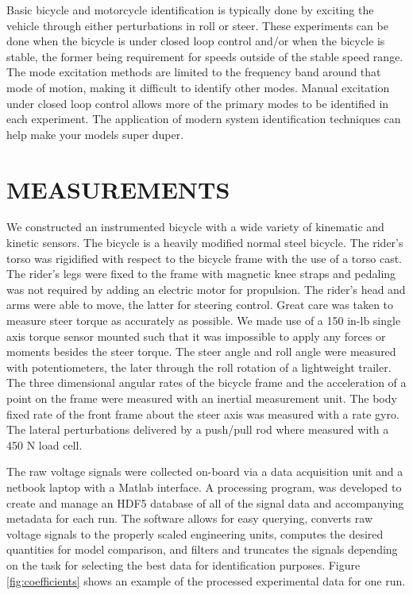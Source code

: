 \documentclass[twocolumn,10pt]{asme2e}
\begin{document}
Basic bicycle and motorcycle identification is typically done by exciting the
vehicle through either perturbations in roll or steer. These experiments can be
done when the bicycle is under closed loop control and/or when the bicycle is
stable, the former being requirement for speeds outside of the stable speed
range.  The mode excitation methods are limited to the frequency band around
that mode of motion, making it difficult to identify other modes.  Manual
excitation under closed loop control allows more of the primary modes to be
identified in each experiment. The application of modern system identification
techniques can help make your models super duper.

\section*{MEASUREMENTS}
We constructed an instrumented bicycle with a wide variety of kinematic and
kinetic sensors. The bicycle is a heavily modified normal steel bicycle. The
rider's torso was rigidified with respect to the bicycle frame with the use of
a torso cast. The rider's legs were fixed to the frame with magnetic knee
straps and pedaling was not required by adding an electric motor for
propulsion. The rider's head and arms were able to move, the latter for
steering control. Great care was taken to measure steer torque as accurately as
possible. We made use of a 150 in-lb single axis torque sensor mounted such
that it was impossible to apply any forces or moments besides the steer torque.
The steer angle and roll angle were measured with potentiometers, the later
through the roll rotation of a lightweight trailer. The three dimensional
angular rates of the bicycle frame and the acceleration of a point on the frame
were measured with an inertial measurement unit. The body fixed rate of the
front frame about the steer axis was measured with a rate gyro. The lateral
perturbations delivered by a push/pull rod where measured with a 450 N load
cell.

The raw voltage signals were collected on-board via a data acquisition unit and
a netbook laptop with a Matlab interface. A processing program, was developed to
create and manage an HDF5 database of all of the signal data and accompanying
metadata for each run. The software allows for easy querying, converts raw
voltage signals to the properly scaled engineering units, computes the desired
quantities for model comparison, and filters and truncates the signals
depending on the task for selecting the best data for identification purposes.
Figure \ref{fig:coefficients} shows an example of the processed experimental
data for one run.
\end{document}
